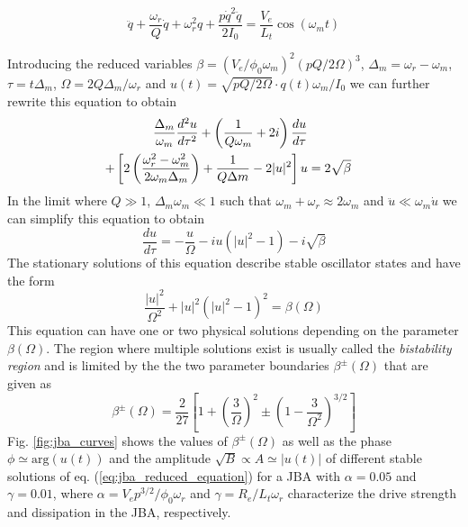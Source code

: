 \begin{equation}
\ddot{q}+\frac{\omega_r}{Q}\dot{q}+\omega_r^2 q + \frac{p \dot{q}^2 \ddot{q}}{2 I_0} = \frac{V_e}{L_t}\cos{\left(\omega_m t \right)}
\end{equation}

Introducing the reduced variables $\beta = (V_e/\phi_0 \omega_m)^2(pQ/2\Omega)^3$, $\Delta_m = \omega_r-\omega_m$, $\tau = t\Delta_m$, $\Omega=2Q\Delta_m/\omega_r$ and $u(t) = \sqrt{pQ/2\Omega}\cdot q(t)\omega_m/I_0$ we can further rewrite this equation to obtain
%
\begin{align}
\frac{\Delta_m}{\omega_m}\frac{d^2 u}{d\tau^2}+\left(\frac{1}{Q \omega_m}+2i\right)\frac{du}{d\tau} \notag \\
 + \left[ 2\left(\frac{\omega_r^2-\omega_m^2}{2\omega_m \Delta_m}\right)+\frac{1}{Q\Delta m}-2|u|^2\right]u & =  2\sqrt{\beta} \label{eq:jba_theory_1}
\end{align}
%
In the limit where $Q \gg 1$, $\Delta_m\omega_m \ll 1$ such that $\omega_m+\omega_r \approx 2\omega_m$ and $\ddot{u}\ll\omega_m \dot{u}$ we can simplify this equation to obtain
%
\begin{equation}
\frac{du}{d\tau} = -\frac{u}{\Omega}-iu\left(|u|^2-1\right)-i\sqrt{\beta} \label{eq:jba_reduced_equation}
\end{equation}
%
The stationary solutions of this equation describe stable oscillator states and have the form
%
\begin{equation}
\frac{|u|^2}{\Omega^2}+|u|^2\left(|u|^2-1\right)^2 = \beta(\Omega)
\end{equation}
%
This equation can have one or two physical solutions depending on the parameter $\beta(\Omega)$. The region where multiple solutions exist is usually called the {\it bistability region} and is limited by the the two parameter boundaries $\beta^\pm(\Omega)$ that are given as
%
\begin{equation}
\beta^\pm(\Omega) = \frac{2}{27}\left[1+\left(\frac{3}{\Omega}\right)^2\pm\left(1-\frac{3}{\Omega^2}\right)^{3/2}\right] \label{eq:jba_beta}
\end{equation}
%
Fig. \ref{fig:jba_curves} shows the values of $\beta^\pm(\Omega)$ as well as the phase $\phi\simeq \mathrm{arg}(u(t))$ and the amplitude $\sqrt{B}\propto A \simeq |u(t)|$ of different stable solutions of eq. (\ref{eq:jba_reduced_equation}) for a JBA with $\alpha=0.05$ and $\gamma=0.01$, where $\alpha=V_ep^{3/2}/\phi_0 \omega_r$ and $\gamma = R_e/L_t\omega_r$ characterize the drive strength and dissipation in the JBA, respectively.

